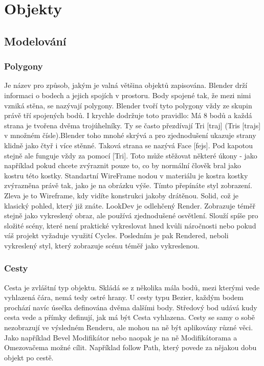 \documentclass[12pt,a4paper]{report}
\begin{document}
	\chapter{Objekty}
	\section{Modelování}
	\subsection{Polygony}
	Je název pro způsob, jakým je valná většina objektů zapisována. Blender
	drží informaci o bodech a jejich spojích v prostoru. Body spojené tak, že
	mezi nimi vzniká stěna, se nazývají polygony. Blender tvoří tyto polygony
	vždy ze skupin právě tří spojených bodů. I krychle dodržuje toto pravidlo:
	Má 8 bodů a každá strana je tvořena dvěma trojúhelníky. Ty se často
	přezdívají Tri [traj] (Tris [trajs] v množném čísle).Blender toho mnohé skrývá a pro zjednodušení ukazuje strany klidně jako
	čtyř i více stěnné. Taková strana se nazývá Face [fejs]. Pod kapotou
	stejně ale funguje vždy za pomocí [Tri]. Toto může stěžovat některé
	úkony - jako například pokud chcete zvýraznit pouze to, co by normální
	člověk bral jako kostru této kostky. Standartní WireFrame nodou
	v materiálu je kostra kostky zvýrazněna právě tak, jako je na obrázku
	výše.
	Tímto přepínáte styl zobrazení. Zleva je to
	Wireframe, kdy vidíte konstrukci jakoby drátěnou. Solid, což je klasický
	pohled, který již znáte. LookDev je odlehčený Render. Zobrazuje téměř
	stejně jako vykreslený obraz, ale používá zjednodušené osvětlení. Slouží
	spíše pro složité scény, které není praktické vykreslovat hned kvůli
	náročnosti nebo pokud váš projekt vyžaduje využití Cycles. Posledním je
	pak Rendered, neboli vykreslený styl, který zobrazuje scénu téměř jako
	vykreslenou.
	
	\subsection{Cesty}
	Cesta je zvláštní typ objektu. Skládá se z několika mála bodů, mezi
	kterými vede vyhlazená čára, nemá tedy ostré hrany. U cesty typu Bezier,
	každým bodem prochází navíc úsečka definována dvěma dalšími body.
	Středový bod udává kudy cesta vede a přímky definují, jak má být Cesta
	vyhlazena.
	Cesty se samy o sobě nezobrazují ve výsledném Renderu, ale mohou na
	ně být aplikovány různé věci. Jako například Bevel Modifikátor nebo
	naopak je na ně Modifikátorama a Omezovačema možné cílit. Například
	follow Path, který povede za nějakou dobu objekt po cestě.
	
\end{document}
